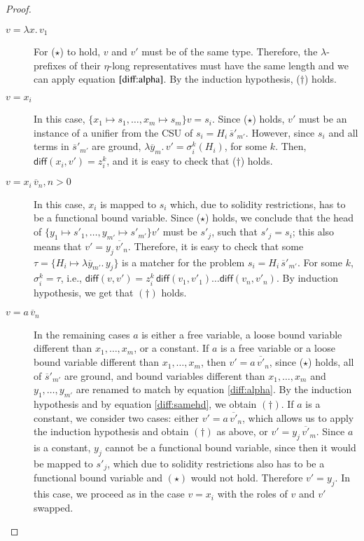 \begin{proof}
  \begin{description}
    \item[$v = \lambda x. \, v_1$]  For ($\star$) to hold, $v$ and $v'$ must be of the
    same type. Therefore, the $\lambda$-prefixes of their $\eta$-long representatives
    must have the same length and we can apply equation
    $\ref{diff:alpha}$. By the induction hypothesis, ($\dagger$) holds.
    \item[$v = x_i$] In this case, $\{x_1 \mapsto s_1, \ldots, x_m \mapsto
    s_m\} v = s_i$. Since ($\star$) holds, $v'$ must be an instance of a unifier from
    the CSU of $s_i = H_i \, \overline{s}'_{m'}$. However, since $s_i$ and all
    terms in $\overline{s}'_{m'}$ are ground, $\lambda \overline{y}_m. \, v' =
    \sigma_i^k(H_i)$, for some $k$. Then, $\textsf{diff}(x_i, v') = z_i^k$, and
    it is easy to check that ($\dagger$) holds.
    \item[$v = x_i \, \overline{v}_n, n > 0$] In this case, $x_i$ is mapped to $s_i$
    which, due to solidity restrictions, has to be a functional bound variable.
    Since ($\star$) holds, we conclude that the head of $\{y_1 \mapsto s'_1, \ldots,
    y_{m'} \mapsto  s'_{m'}\}v'$ must be $s'_{j}$, such that $s'_{j} = s_i$;
    this also means that $v' = y_j \, \overline{v'}_n$. Therefore, it is easy to
    check that some $\tau = \{ H_i \mapsto \lambda \overline{y}_{m'}. \, y_j\}$ is
    a matcher for the problem $s_i = H_i \, \overline{s}'_{m'}$. For some $k$,
    $\sigma_i^k = \tau$, i.e., $\textsf{diff}(v,v') = z_i^k \, \textsf{diff}(v_1, v'_1)
    \ldots \textsf{diff}(v_n, v'_n) $. By induction hypothesis, we get that $(\dagger)$ holds.
    \item[$v = a \, \overline{v}_n$] In the remaining cases $a$ is either a free variable, a loose bound variable
    different than $x_1, \ldots, x_m$, or a constant. If $a$ is a free variable or a loose bound variable
    different than $x_1, \ldots, x_m$, then $v' = a \, \overline{v'}_n$, since
    ($\star$) holds, all of $\overline{s}'_{m'}$ are ground, and bound variables different than
    $x_1, \ldots, x_m$ and $y_1, \ldots, y_{m'}$ are renamed to match by equation \ref{diff:alpha}. 
    By the induction
    hypothesis and by equation \ref{diff:samehd}, we obtain $(\dagger)$. If $a$ is a constant, we consider two
    cases: either $v' = a \, \overline{v'}_n$, which allows us to apply the induction
    hypothesis and obtain $(\dagger)$ as above, or $v' = y_j \, \overline{v'}_m$.
    Since $a$ is a constant, $y_j$ cannot be a functional bound variable, since
    then it would be mapped to $s'_j$, which due to solidity restrictions 
    also has to be a functional bound
    variable and $(\star)$ would not hold. Therefore $v' = y_j$. In this case, we
    proceed as in the case $v = x_i$ with the roles of $v$ and $v'$ swapped. \qedhere
  \end{description}
  



\end{proof}
